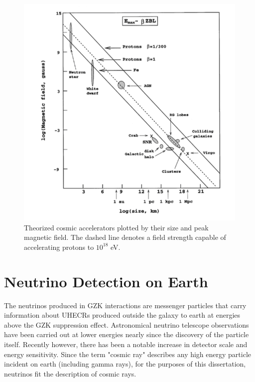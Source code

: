 \begin{figure}
	\centering
	\includegraphics[width=\textwidth]{figures/cosmicAccelerators}
	\caption{Theorized cosmic accelerators plotted by their size and peak magnetic field.  The dashed line denotes 
a field strength capable of accelerating protons to $10^{18}$ eV. \cite{RevModPhys.71.S33} }
	\label{fig:cosmicAccels}
\end{figure}


\section{Neutrino Detection on Earth}
	The neutrinos produced in GZK interactions are messenger particles that carry information about UHECRs produced outside the galaxy to earth at energies above the GZK suppression effect.  Astronomical neutrino telescope observations have been carried out at lower energies nearly since the discovery of the particle itself. Recently however, there has been a notable increase in detector scale and energy sensitivity.  Since the term "cosmic ray" describes any high energy particle incident on earth (including gamma rays), for the purposes of this dissertation, neutrinos fit the description of cosmic rays.
	
